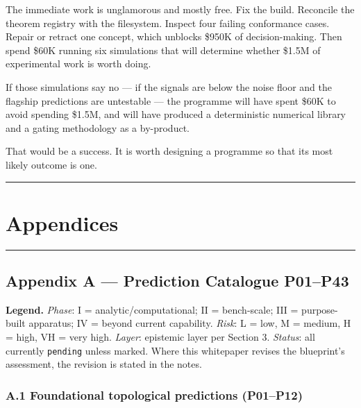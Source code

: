\documentclass[
  11pt]{report}
\begin{document}
The immediate work is unglamorous and mostly free. Fix the build.
Reconcile the theorem registry with the filesystem. Inspect four failing
conformance cases. Repair or retract one concept, which unblocks \$950K
of decision-making. Then spend \$60K running six simulations that will
determine whether \$1.5M of experimental work is worth doing.

If those simulations say no --- if the signals are below the noise floor
and the flagship predictions are untestable --- the programme will have
spent \$60K to avoid spending \$1.5M, and will have produced a
deterministic numerical library and a gating methodology as a
by-product.

That would be a success. It is worth designing a programme so that its
most likely outcome is one.

\begin{center}\rule{0.5\linewidth}{0.5pt}\end{center}

\hypertarget{appendices}{%
\part{Appendices}\label{appendices}}

\begin{center}\rule{0.5\linewidth}{0.5pt}\end{center}

\hypertarget{appendix-a-prediction-catalogue-p01p43}{%
\chapter{Appendix A --- Prediction Catalogue
P01--P43}\label{appendix-a-prediction-catalogue-p01p43}}

\textbf{Legend.} \emph{Phase}: I = analytic/computational; II =
bench-scale; III = purpose-built apparatus; IV = beyond current
capability. \emph{Risk}: L = low, M = medium, H = high, VH = very high.
\emph{Layer}: epistemic layer per Section 3. \emph{Status}: all
currently \texttt{pending} unless marked. Where this whitepaper revises
the blueprint's assessment, the revision is stated in the notes.

\hypertarget{a.1-foundational-topological-predictions-p01p12}{%
\section{A.1 Foundational topological predictions
(P01--P12)}\label{a.1-foundational-topological-predictions-p01p12}}
\end{document}
